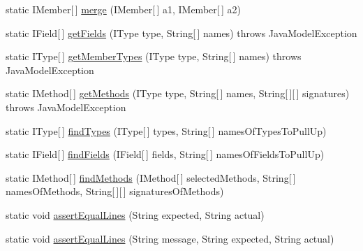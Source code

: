 \begin{DoxyCompactItemize}
\item 
static IMember\mbox{[}$\,$\mbox{]} \hyperlink{classorg_1_1eclipse_1_1jdt_1_1ui_1_1tests_1_1refactoring_1_1infra_1_1RefactoringTest_a4189ee86647b385cef23fc23f2a2391d}{merge} (IMember\mbox{[}$\,$\mbox{]} a1, IMember\mbox{[}$\,$\mbox{]} a2)
\item 
static IField\mbox{[}$\,$\mbox{]} \hyperlink{classorg_1_1eclipse_1_1jdt_1_1ui_1_1tests_1_1refactoring_1_1infra_1_1RefactoringTest_a979e4c8b6f65a2e5f2194bb88607df96}{getFields} (IType type, String\mbox{[}$\,$\mbox{]} names)  throws JavaModelException
\item 
static IType\mbox{[}$\,$\mbox{]} \hyperlink{classorg_1_1eclipse_1_1jdt_1_1ui_1_1tests_1_1refactoring_1_1infra_1_1RefactoringTest_a8ccee10f4da490913a9f66a13630e6c5}{getMemberTypes} (IType type, String\mbox{[}$\,$\mbox{]} names)  throws JavaModelException
\item 
static IMethod\mbox{[}$\,$\mbox{]} \hyperlink{classorg_1_1eclipse_1_1jdt_1_1ui_1_1tests_1_1refactoring_1_1infra_1_1RefactoringTest_adf4a0bdd6b14679f89ec87ea92a3653c}{getMethods} (IType type, String\mbox{[}$\,$\mbox{]} names, String\mbox{[}$\,$\mbox{]}\mbox{[}$\,$\mbox{]} signatures)  throws JavaModelException
\item 
static IType\mbox{[}$\,$\mbox{]} \hyperlink{classorg_1_1eclipse_1_1jdt_1_1ui_1_1tests_1_1refactoring_1_1infra_1_1RefactoringTest_aabcefd1270a30399a2062f5949cb0286}{findTypes} (IType\mbox{[}$\,$\mbox{]} types, String\mbox{[}$\,$\mbox{]} namesOfTypesToPullUp)
\item 
static IField\mbox{[}$\,$\mbox{]} \hyperlink{classorg_1_1eclipse_1_1jdt_1_1ui_1_1tests_1_1refactoring_1_1infra_1_1RefactoringTest_a3e86b7664f4939315fac7e0941c173d7}{findFields} (IField\mbox{[}$\,$\mbox{]} fields, String\mbox{[}$\,$\mbox{]} namesOfFieldsToPullUp)
\item 
static IMethod\mbox{[}$\,$\mbox{]} \hyperlink{classorg_1_1eclipse_1_1jdt_1_1ui_1_1tests_1_1refactoring_1_1infra_1_1RefactoringTest_a5edcbefda2477a94f9eb2992986f88b9}{findMethods} (IMethod\mbox{[}$\,$\mbox{]} selectedMethods, String\mbox{[}$\,$\mbox{]} namesOfMethods, String\mbox{[}$\,$\mbox{]}\mbox{[}$\,$\mbox{]} signaturesOfMethods)
\item 
static void \hyperlink{classorg_1_1eclipse_1_1jdt_1_1ui_1_1tests_1_1refactoring_1_1infra_1_1RefactoringTest_aaa49b1f8158b5a973df922bb0c85b1ad}{assertEqualLines} (String expected, String actual)
\item 
static void \hyperlink{classorg_1_1eclipse_1_1jdt_1_1ui_1_1tests_1_1refactoring_1_1infra_1_1RefactoringTest_a0f60a75ac64facaa30722bebf63fe2a6}{assertEqualLines} (String message, String expected, String actual)
\end{DoxyCompactItemize}
